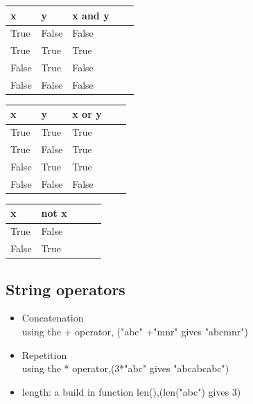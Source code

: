 \documentclass[12pt,oneside]{book}
\begin{document}
\begin{minipage}{0.3\linewidth}
	\begin{tabular}{|l|l|l|l|l|}
		\hline
		x     & y     & x and y \\ \hline
		True  & False & False   \\ \hline
		True  & True  & True    \\ \hline
		False & True  & False   \\ \hline
		False & False & False   \\ \hline
	\end{tabular}
\end{minipage}
\begin{minipage}{0.3\linewidth}
	\begin{tabular}{|l|l|l|l|l|}
		\hline
		x     & y     & x or y \\ \hline
		True  & True  & True   \\ \hline
		True  & False & True   \\ \hline
		False & True  & True   \\ \hline
		False & False & False  \\ \hline
	\end{tabular}
\end{minipage}
\begin{minipage}{0.3\linewidth}
	\begin{tabular}{|l|l|l|l|l|}
		\hline
		x     & not x \\ \hline
		True  & False \\ \hline
		False & True  \\ \hline
	\end{tabular}
\end{minipage}
\subsection{String operators}
\begin{itemize}
	\item Concatenation\\
	      using the + operator, ("abc" +"mnr" gives "abcmnr")
	\item Repetition\\
	      using the * operator,(3*"abc" gives "abcabcabc")
	\item length:
	      a build in function len(),(len("abc") gives 3)
\end{itemize}
\end{document}
